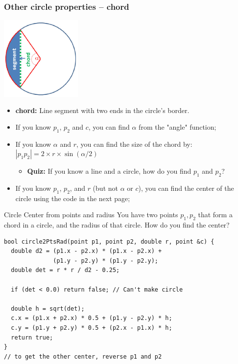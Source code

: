 \begin{frame}
  \frametitle{Other circle properties -- chord}
  \centering
    \includegraphics[width=0.3\textwidth]{../img/circle_halim1}

  \begin{itemize}
  \item {\bf chord:} Line segment with two ends in the circle's border.
  \item If you know $p_1$, $p_2$ and $c$, you can find $\alpha$ from the "angle" function;
  \item If you know $\alpha$ and $r$, you can find the size of the chord by: $|p_1p_2| = 2\times r\times\sin(\alpha/2)$
  \begin{itemize}
    \item {\bf Quiz:} If you know a line and a circle, how do you find $p_1$ and $p_2$?
  \end{itemize}
  \item If you know $p_1$, $p_2$, and $r$ (but not $\alpha$ or $c$), you can find the center of the circle using the code in the next page;
  \end{itemize}
\end{frame}

\begin{frame}[fragile]{Circle Center from points and radius}
  You have two points $p_1, p_2$ that form a chord in a circle, and the radius of that circle. How do you find the center?

  {\smaller
\begin{exampleblock}{}
\begin{verbatim}
bool circle2PtsRad(point p1, point p2, double r, point &c) {
  double d2 = (p1.x - p2.x) * (p1.x - p2.x) +
              (p1.y - p2.y) * (p1.y - p2.y);
  double det = r * r / d2 - 0.25;

  if (det < 0.0) return false; // Can't make circle

  double h = sqrt(det);
  c.x = (p1.x + p2.x) * 0.5 + (p1.y - p2.y) * h;
  c.y = (p1.y + p2.y) * 0.5 + (p2.x - p1.x) * h;
  return true;
}
// to get the other center, reverse p1 and p2
\end{verbatim}
\end{exampleblock}
  }
\end{frame}

